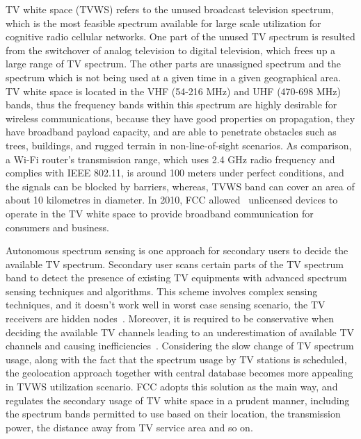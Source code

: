 TV white space (\gls{TVWS}) refers to the unused broadcast television spectrum, which is the most feasible spectrum available for large scale utilization for cognitive radio cellular networks.
One part of the unused TV spectrum is resulted from the switchover of analog television to digital television, which frees up a large range of TV spectrum.
The other parts are unassigned spectrum and the spectrum which is not being used at a given time in a given geographical area.
TV white space is located in the VHF (54-216 MHz) and UHF (470-698 MHz) bands, thus the frequency bands within this spectrum are highly desirable for wireless communications, because they have good properties on propagation, \ie they have broadband payload capacity, and are able to penetrate obstacles such as trees, buildings, and rugged terrain in non-line-of-sight scenarios.
As comparison, a Wi-Fi router's transmission range, which uses 2.4 GHz radio frequency and complies with IEEE 802.11, is around 100 meters under perfect conditions, and the signals can be blocked by barriers, whereas, TVWS band can cover an area of about 10 kilometres in diameter.
In 2010, FCC allowed~\cite{FCC_2010_sedond_memorandumm} unlicensed devices to operate in the TV white space to provide broadband communication for consumers and business.

Autonomous spectrum sensing is one approach for secondary users to decide the available TV spectrum. 
Secondary user scans certain parts of the TV spectrum band to detect the presence of existing TV equipments with advanced spectrum sensing techniques and algorithms.
This scheme involves complex sensing techniques, and it doesn't work well in worst case sensing scenario, \ie the TV receivers are hidden nodes~\cite{maximum_power_TVWS_dyspan_2011}.
Moreover, it is required to be conservative when deciding the available TV channels leading to an underestimation of available TV channels and causing inefficiencies~\cite{geoTVprotection08dyspan}.
Considering the slow change of TV spectrum usage, along with the fact that the spectrum usage by TV stations is scheduled, the geolocation approach together with central database becomes more appealing in TVWS utilization scenario.
FCC adopts this solution as the main way, and regulates the secondary usage of TV white space in a prudent manner, including the spectrum bands permitted to use based on their location, the transmission power, the distance away from TV service area and so on.


